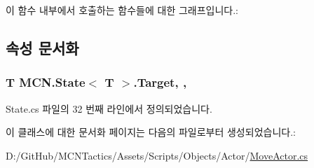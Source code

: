 이 함수 내부에서 호출하는 함수들에 대한 그래프입니다.\+:




\subsection{속성 문서화}
\subsubsection[{\texorpdfstring{Target}{Target}}]{\setlength{\rightskip}{0pt plus 5cm}T {\bf M\+C\+N.\+State}$<$ T $>$.Target\hspace{0.3cm}{\ttfamily [get]}, {\ttfamily [protected]}, {\ttfamily [inherited]}}\hypertarget{class_m_c_n_1_1_state_a93ba2fd920292031bd6e65b1dc505cb3}{}\label{class_m_c_n_1_1_state_a93ba2fd920292031bd6e65b1dc505cb3}


State.\+cs 파일의 32 번째 라인에서 정의되었습니다.



이 클래스에 대한 문서화 페이지는 다음의 파일로부터 생성되었습니다.\+:\begin{DoxyCompactItemize}
\item 
D\+:/\+Git\+Hub/\+M\+C\+N\+Tactics/\+Assets/\+Scripts/\+Objects/\+Actor/\hyperlink{_move_actor_8cs}{Move\+Actor.\+cs}\end{DoxyCompactItemize}
